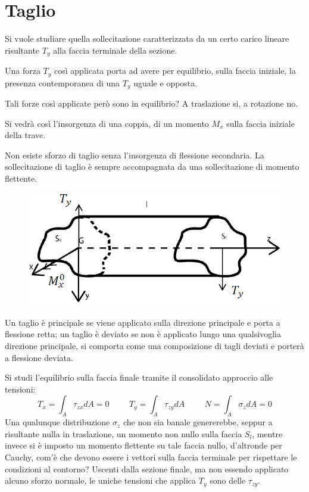 
\section{Taglio}
		Si vuole studiare quella sollecitazione caratterizzata da un certo carico lineare risultante $T_y$ alla faccia terminale della sezione.
	
		Una forza $T_y$ così applicata porta ad avere per equilibrio, sulla faccia iniziale, la presenza contemporanea di una $T_y$ uguale e opposta. 
	
		Tali forze così applicate però sono in equilibrio? A traslazione si, a rotazione no.
	
		Si vedrà così l'insorgenza di una coppia, di un momento $M_x$ sulla faccia iniziale della trave. \newline 
	
		Non esiste sforzo di taglio senza l'insorgenza di flessione secondaria. La sollecitazione di taglio è sempre accompagnata da una sollecitazione di momento flettente. 
	
\begin{figure}[H]
	\centering
	\includegraphics[width=0.5\linewidth]{immagini_6/screenshot001}
	\label{fig:screenshot001}
\end{figure}


		Un taglio è principale se viene applicato sulla direzione principale e porta a flessione retta; un taglio è deviato se non è applicato lungo una qualsivoglia direzione principale, si comporta come una composizione di tagli deviati e porterà a flessione deviata. \newline 
		
		Si studi l'equilibrio sulla faccia finale tramite il consolidato approccio alle tensioni: 
		\[ T_x = \int_A \tau_{zx}dA  = 0 \hspace{1cm}  T_y = \int_A \tau_{zy}dA  \hspace{1cm} N = \int_A\sigma_zdA = 0\]	
		Una qualunque distribuzione $\sigma_z$ che non sia banale genererebbe, seppur a risultante nulla in traslazione, un momento non nullo sulla faccia $S_l$, mentre invece si è imposto un momento flettente su tale faccia nullo, d'altronde per Cauchy, com'è che devono essere i vettori sulla faccia terminale per rispettare le condizioni al contorno? Uscenti dalla sezione finale, ma non essendo applicato alcuno sforzo normale, le uniche tensioni che applica $T_y$ sono delle $\tau_{zy}$.  \newline 
		
